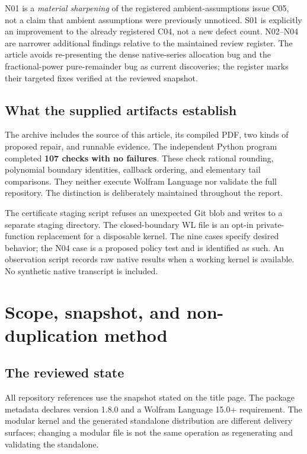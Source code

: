 \documentclass[11pt,a4paper]{article}
\newcommand{\code}[1]{\texttt{\detokenize{#1}}}
\begin{document}
N01 is a \emph{material sharpening} of the registered ambient-assumptions issue C05, not a claim that ambient assumptions were previously unnoticed. S01 is explicitly an improvement to the already registered C04, not a new defect count. N02--N04 are narrower additional findings relative to the maintained review register. The article avoids re-presenting the dense native-series allocation bug and the fractional-power pure-remainder bug as current discoveries; the register marks their targeted fixes verified at the reviewed snapshot.\cite{status,r8,r2}

\subsection{What the supplied artifacts establish}
The archive includes the source of this article, its compiled PDF, two kinds of proposed repair, and runnable evidence. The independent Python program completed \textbf{107 checks with no failures}. These check rational rounding, polynomial boundary identities, callback ordering, and elementary tail comparisons. They neither execute Wolfram Language nor validate the full repository. The distinction is deliberately maintained throughout the report.

The certificate staging script refuses an unexpected Git blob and writes to a separate staging directory. The closed-boundary WL file is an opt-in private-function replacement for a disposable kernel. The nine \code{VerificationTest} cases specify desired behavior; the N04 case is a proposed policy test and is identified as such. An observation script records raw native results when a working kernel is available. No synthetic native transcript is included.

\section{Scope, snapshot, and non-duplication method}

\subsection{The reviewed state}
All repository references use the snapshot stated on the title page. The package metadata declares version 1.8.0 and a Wolfram Language 15.0+ requirement. The modular kernel and the generated standalone distribution are different delivery surfaces; changing a modular file is not the same operation as regenerating and validating the standalone.\cite{paclet,main,status}
\end{document}
